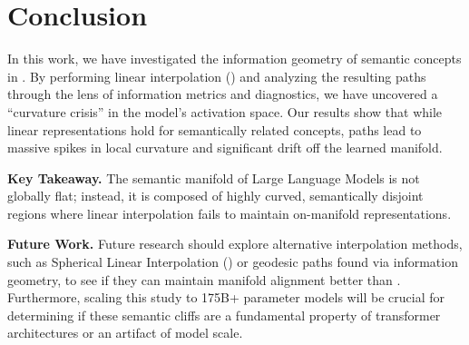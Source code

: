 \section{Conclusion}

In this work, we have investigated the information geometry of \incongruent semantic concepts in \gpttwo. By performing linear interpolation (\lerp) and analyzing the resulting paths through the lens of information metrics and \sae diagnostics, we have uncovered a ``curvature crisis'' in the model's activation space. Our results show that while linear representations hold for semantically related concepts, \incongruent paths lead to massive spikes in local curvature and significant drift off the learned manifold.

{\bf Key Takeaway.} The semantic manifold of Large Language Models is not globally flat; instead, it is composed of highly curved, semantically disjoint regions where linear interpolation fails to maintain on-manifold representations.

{\bf Future Work.} Future research should explore alternative interpolation methods, such as Spherical Linear Interpolation (\slerp) or geodesic paths found via information geometry, to see if they can maintain manifold alignment better than \lerp. Furthermore, scaling this study to 175B+ parameter models will be crucial for determining if these semantic cliffs are a fundamental property of transformer architectures or an artifact of model scale.
